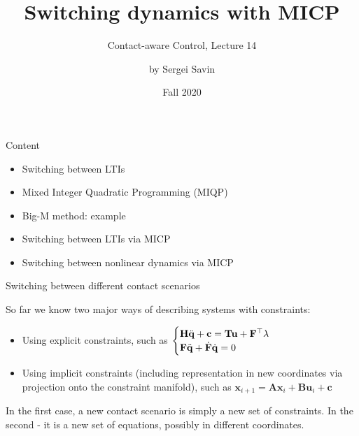 \documentclass{beamer}
\title{Switching dynamics with MICP}
\subtitle{Contact-aware Control, Lecture 14}
\author{by Sergei Savin}
\date{Fall 2020}
\begin{document}
\maketitle


\begin{frame}{Content}

\begin{itemize}
\item Switching between LTIs
\item Mixed Integer Quadratic Programming (MIQP)
\item Big-M method: example
\item Switching between LTIs via MICP
\item Switching between nonlinear dynamics via MICP
\end{itemize}

\end{frame}




\begin{frame}{Switching between different contact scenarios}
\begin{flushleft}

So far we know two major ways of describing systems with constraints:

\begin{itemize}
    \item Using explicit constraints, such as $\begin{cases}
    \mathbf{H} \ddot{\mathbf{q}} + \mathbf{c} = \mathbf{T}\mathbf{u} + \mathbf{F}^\top \lambda \\
    \mathbf{F} \ddot{\mathbf{q}} + \dot{\mathbf{F}} \dot{\mathbf{q}} = 0
\end{cases}$
    
    \item Using implicit constraints (including representation in new coordinates via projection onto the constraint manifold), such as $\mathbf{x}_{i+1} = \mathbf{A} \mathbf{x}_i + \mathbf{B} \mathbf{u}_i + \mathbf{c}$
\end{itemize}

In the first case, a new contact scenario is simply a new set of constraints. In the second - it is a new set of equations, possibly in different coordinates.

\end{flushleft}
\end{frame}
\end{document}
